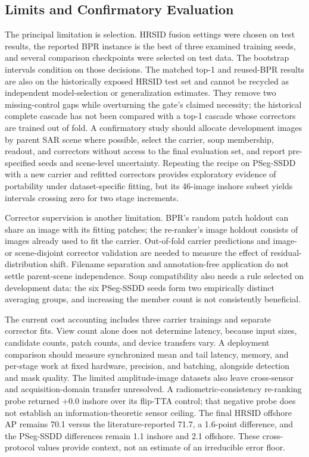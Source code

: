 \subsection{Limits and Confirmatory Evaluation}\label{sec:disc-limitations}
The principal limitation is selection. HRSID fusion settings were chosen on test results, the reported BPR instance is the best of three examined training seeds, and several comparison checkpoints were selected on test data. The bootstrap intervals condition on those decisions. The matched top-1 and reused-BPR results are also on the historically exposed HRSID test set and cannot be recycled as independent model-selection or generalization estimates. They remove two missing-control gaps while overturning the gate's claimed necessity; the historical complete cascade has not been compared with a top-1 cascade whose correctors are trained out of fold. A confirmatory study should allocate development images by parent SAR scene where possible, select the carrier, soup membership, readout, and correctors without access to the final evaluation set, and report pre-specified seeds and scene-level uncertainty. Repeating the recipe on PSeg-SSDD with a new carrier and refitted correctors provides exploratory evidence of portability under dataset-specific fitting, but its 46-image inshore subset yields intervals crossing zero for two stage increments.

Corrector supervision is another limitation. BPR's random patch holdout can share an image with its fitting patches; the re-ranker's image holdout consists of images already used to fit the carrier. Out-of-fold carrier predictions and image- or scene-disjoint corrector validation are needed to measure the effect of residual-distribution shift. Filename separation and annotation-free application do not settle parent-scene independence. Soup compatibility also needs a rule selected on development data: the six PSeg-SSDD seeds form two empirically distinct averaging groups, and increasing the member count is not consistently beneficial.

The current cost accounting includes three carrier trainings and separate corrector fits. View count alone does not determine latency, because input sizes, candidate counts, patch counts, and device transfers vary. A deployment comparison should measure synchronized mean and tail latency, memory, and per-stage work at fixed hardware, precision, and batching, alongside detection and mask quality. The limited amplitude-image datasets also leave cross-sensor and acquisition-domain transfer unresolved. A radiometric-consistency re-ranking probe returned +0.0 inshore over its flip-TTA control; that negative probe does not establish an information-theoretic sensor ceiling. The final HRSID offshore AP remains 70.1 versus the literature-reported 71.7, a 1.6-point difference, and the PSeg-SSDD differences remain 1.1 inshore and 2.1 offshore. These cross-protocol values provide context, not an estimate of an irreducible error floor.

